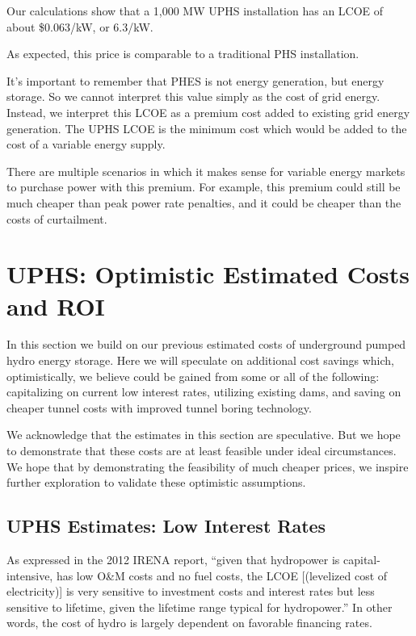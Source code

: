 \documentclass[hidelinks,12pt,a4paper]{article}
\begin{document}
\begin{displayquote}
Our calculations show that a 1,000 MW UPHS installation has an LCOE of about \$0.063/kW, or 6.3\cent/kW.
\end{displayquote}

As expected, this price is comparable to a traditional PHS installation.

It's important to remember that PHES is not energy generation, but energy storage. So we cannot interpret this value simply as the cost of grid energy. Instead, we interpret this LCOE as a premium cost added to existing grid energy generation. The UPHS LCOE is the minimum cost which would be added to the cost of a variable energy supply.

There are multiple scenarios in which it makes sense for variable energy markets to purchase power with this premium. For example, this premium could still be much cheaper than peak power rate penalties, and it could be cheaper than the costs of curtailment.


\pagebreak[4]
\section{UPHS: Optimistic Estimated Costs and ROI}
In this section we build on our previous estimated costs of underground pumped hydro energy storage. Here we will speculate on additional cost savings which, optimistically, we believe could be gained from some or all of the following: capitalizing on current low interest rates, utilizing existing dams, and saving on cheaper tunnel costs with improved tunnel boring technology.

We acknowledge that the estimates in this section are speculative. But we hope to demonstrate that these costs are at least feasible under ideal circumstances. We hope that by demonstrating the feasibility of much cheaper prices, we inspire further exploration to validate these optimistic assumptions.

\subsection{UPHS Estimates: Low Interest Rates}
As expressed in the 2012 IRENA report, “given that hydropower is capital-intensive, has low O\&M costs and no fuel costs, the LCOE [(levelized cost of electricity)] is very sensitive to investment costs and interest rates but less sensitive to lifetime, given the lifetime range typical for hydropower.” \cite{RenewableEnergyTechnologiesCostAnalysisSeries} In other words, the cost of hydro is largely dependent on favorable financing rates.
\end{document}
